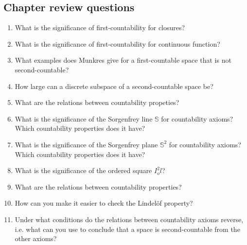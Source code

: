 \subsection{Chapter review questions}

\begin{enumerate}
    \item What is the significance of first-countability for closures?
    \item What is the significance of first-countability for continuous function?
    \item What examples does Munkres give for a first-countable space that is not second-countable?
    \item How large can a discrete subspace of a second-countable space be?
    \item What are the relations between countability propeties?
    \item What is the significance of the Sorgenfrey line \( \mathbb{S} \) for countability axioms? Which countability properties does it have?
    \item What is the significance of the Sorgenfrey plane \( \mathbb{S}^2 \) for countability axioms? Which countability properties does it have?
    \item What is the significance of the ordered square \( I_o^2l \)?
    \item What are the relations between countability properties?
    \item How can you make it easier to check the Lindel\"of property?
    \item Under what conditions do the relations between countability axioms reverse, i.e. what can you use to conclude that a space is second-countable from the other axioms?
\end{enumerate}

